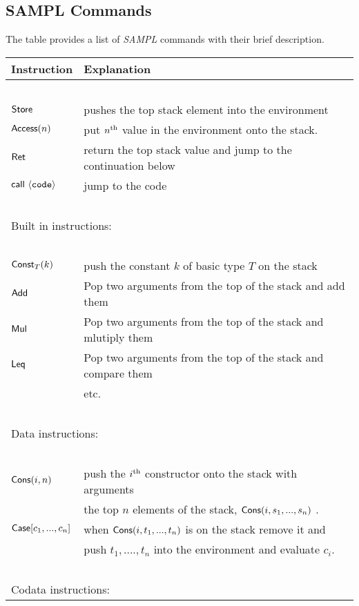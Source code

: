 \documentclass[11pt]{article}
\newcommand{\<}{\langle}
\renewcommand{\>}{\rangle}
\begin{document}
\subsection {SAMPL Commands}
The table provides a list of {\em SAMPL} commands with their brief description.
\begin{center}
\begin{tabular}{|l|l|}
\hline
Instruction &Explanation \\ \hline
~ & ~\\
${\sf Store}$ &   pushes the top stack element into the environment \\
${\sf Access}(n)$    &   put $n^{\rm th}$ value in the environment onto the stack. \\ 
${\sf Ret} $     &       return the top stack value and jump to the continuation below \\ 
${\sf call}~\<{\tt code}\>$ & jump to the code \\
 ~ & ~ \\ \hline
\multicolumn{2}{|l|}{Built in instructions:} \\ \hline
~ & ~ \\ 
 ${\sf Const}_T(k)$       &    push the constant $k$ of basic type $T$ on the stack \\
${\sf Add}$ &             Pop two arguments from the top of the stack and add them \\ 
${\sf Mul}$ &             Pop two arguments from the top of the stack and mlutiply them \\ 
${\sf Leq}$  &            Pop two arguments from the top of the stack and compare them \\ ~ & etc. \\ 
~ & ~\\ \hline
\multicolumn{2}{|l|}{Data instructions:} \\ \hline
~ & ~ \\ 
 ${\sf Cons}(i,n)$       &    push the $i^{\rm th}$ constructor onto the stack with arguments \\
                                  & the top $n$ elements of the stack, ${\sf Cons}(i,s_1,...,s_n)$ . \\
 ${\sf Case}[c_1,...,c_n]$ &     when ${\sf Cons}(i,t_1,...,t_n)$  is on the stack remove it and \\
                                   & push $t_1, ...., t_n$ into the environment and evaluate $c_i$. \\ 
 ~ & ~ \\ \hline
 \multicolumn{2}{|l|}{Codata instructions:} \\ \hline

\end{tabular}
\end{center}
\end{document}
